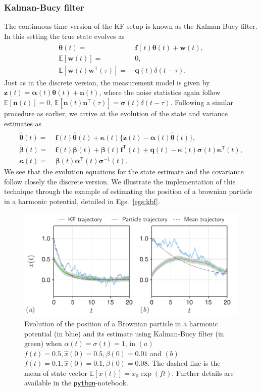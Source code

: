 \documentclass{resonance}
\def\E{\mathbb{E}}
\def\x{\bm{\theta}}
\def\thh{\bm{\hat{\theta}}}
\def\n{\bm{n}}
\def\z{\mathbf{z}}
\def\f{\bm{f}}
\def\w{\mathbf{w}}
\def\q{\mathbf{q}}
\def\p{\bm{\beta}}
\def\K{\bm{\kappa}}
\def\T{\mathsf{T}}
\def\S{\bm{\sigma}}
\def\H{\bm{\alpha}}
\def\E{\mathbb{E}}
\begin{document}
\subsubsection*{Kalman-Bucy filter}
The continuous time version of the KF setup is known as the Kalman-Bucy filter. In this setting the true state evolves as
\begin{align}
\dot{\x}(t) =& \ \f(t) \x(t) + \w(t), \\
\E [\w(t)] =& \ 0, \\
\E [\w(t) \w^\T(\tau)] =& \ \q(t) \delta (t-\tau).
\end{align}
Just as in the discrete version, the measurement model is given by $\z(t) = \H(t) \x(t) + \n(t)$, where the noise statistics again follow $\E[\n(t)] = 0$, $\E[\n(t) \n^\T(\tau)] =\S(t) \delta(t-\tau)$. Following a similar procedure as earlier, we arrive at the evolution of the state and variance estimates as
\begin{align}
\dot{\thh}(t) =& \ \f(t) \thh(t) + \K(t)\{ \z(t) - \H(t) \thh(t) \}, \\ 
\dot{\p}(t) =& \ \f(t) \p(t) + \p(t) \f^\T(t) + \q(t) - \K(t) \S(t) \K^\T(t), \\
\K(t) =& \ \p(t) \H^\T(t) \S^{-1}(t).
\end{align}
We see that the evolution equations for the state estimate and the covariance follow closely the discrete version. We illustrate the implementation of this technique through the example of estimating the position of a brownian particle in a harmonic potential, detailed in Egs.~\ref{egs:kbf}.

\begin{figure}
    \centering
    \includegraphics[width=\textwidth]{./figs/kbf.pdf}
    \caption{Evolution of the position of a Brownian particle in a harmonic potential (in blue) and its estimate using Kalman-Bucy filter (in green) when $\alpha(t) = \sigma(t) = 1$, in $(a)$ $f(t) = 0.5, \hat{x}(0) = 0.5, \beta(0) = 0.01$ and $(b)$ $f(t) = 0.1, \hat{x}(0) = 0.1, \beta(0) = 0.08$. The dashed line is the mean of state vector $\E[x(t)]=x_0 \exp(f t)$. Further details are available in the \href{https://github.com/sgangaprasath/KFTutorial/blob/main/KFTutorial.ipynb}{\texttt{python}}-notebook.}
    \label{fig:kbfFig}
\end{figure}
\end{document}
